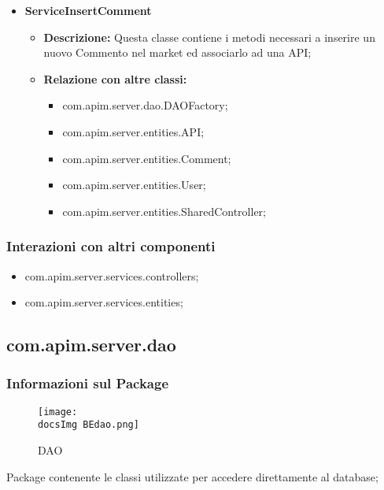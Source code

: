 {{{{\begin{itemize}
\begin{itemize}
            \begin{itemize}
              \item com.apim.server.dao.DAOFactory;
              \item com.apim.server.entities.API;
              \item com.apim.server.entities.SharedController;
            \end{itemize}
          \end{itemize}
          \item \textbf{ServiceInsertComment}
          \begin{itemize}
            \item \textbf{Descrizione:} Questa classe contiene i metodi necessari a inserire un nuovo Commento nel market ed associarlo ad una API;
            \item \textbf{Relazione con altre classi:}
            \begin{itemize}
              \item com.apim.server.dao.DAOFactory;
              \item com.apim.server.entities.API;
              \item com.apim.server.entities.Comment;
              \item com.apim.server.entities.User;
              \item com.apim.server.entities.SharedController;
            \end{itemize}
          \end{itemize}
       \end{itemize}
       \subsubsection{Interazioni con altri componenti}
          \begin{itemize}
            \item com.apim.server.services.controllers;
            \item com.apim.server.services.entities;
          \end{itemize}
          
          
          \subsection{com.apim.server.dao}{
    \subsubsection{Informazioni sul Package}
        \begin{figure}[ht]
          \centering
         \texttt{[image: \\docsImg BEdao.png]}
          \caption{DAO}
          \label{DAO}
        \end{figure}
       Package  contenente le classi utilizzate per accedere direttamente al database;
}}}}}
